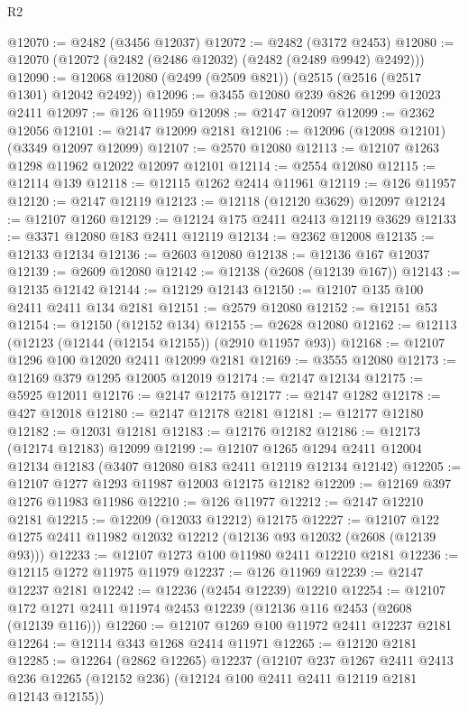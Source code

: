 \begin{lexlean}{R2}
\begin{coremodule}
@12070 := @2482 (@3456 @12037)
@12072 := @2482 (@3172 @2453)
@12080 := @12070 (@12072 (@2482 (@2486 @12032) (@2482 (@2489 @9942) @2492)))
@12090 := @12068 @12080 (@2499 (@2509 @821)) (@2515 (@2516 (@2517 @1301) @12042 @2492))
@12096 := @3455 @12080 @239 @826 @1299 @12023 @2411
@12097 := @126 @11959
@12098 := @2147 @12097
@12099 := @2362 @12056
@12101 := @2147 @12099 @2181
@12106 := @12096 (@12098 @12101) (@3349 @12097 @12099)
@12107 := @2570 @12080
@12113 := @12107 @1263 @1298 @11962 @12022 @12097 @12101
@12114 := @2554 @12080
@12115 := @12114 @139
@12118 := @12115 @1262 @2414 @11961
@12119 := @126 @11957
@12120 := @2147 @12119
@12123 := @12118 (@12120 @3629) @12097
@12124 := @12107 @1260
@12129 := @12124 @175 @2411 @2413 @12119 @3629
@12133 := @3371 @12080 @183 @2411 @12119
@12134 := @2362 @12008
@12135 := @12133 @12134
@12136 := @2603 @12080
@12138 := @12136 @167 @12037
@12139 := @2609 @12080
@12142 := @12138 (@2608 (@12139 @167))
@12143 := @12135 @12142
@12144 := @12129 @12143
@12150 := @12107 @135 @100 @2411 @2411 @134 @2181
@12151 := @2579 @12080
@12152 := @12151 @53
@12154 := @12150 (@12152 @134)
@12155 := @2628 @12080
@12162 := @12113 (@12123 (@12144 (@12154 @12155)) (@2910 @11957 @93))
@12168 := @12107 @1296 @100 @12020 @2411 @12099 @2181
@12169 := @3555 @12080
@12173 := @12169 @379 @1295 @12005 @12019
@12174 := @2147 @12134
@12175 := @5925 @12011
@12176 := @2147 @12175
@12177 := @2147 @1282
@12178 := @427 @12018
@12180 := @2147 @12178 @2181
@12181 := @12177 @12180
@12182 := @12031 @12181
@12183 := @12176 @12182
@12186 := @12173 (@12174 @12183) @12099
@12199 := @12107
    @1265
    @1294
    @2411
    @12004
    @12134
    @12183
    (@3407 @12080 @183 @2411 @12119 @12134 @12142)
@12205 := @12107 @1277 @1293 @11987 @12003 @12175 @12182
@12209 := @12169 @397 @1276 @11983 @11986
@12210 := @126 @11977
@12212 := @2147 @12210 @2181
@12215 := @12209 (@12033 @12212) @12175
@12227 := @12107 @122 @1275 @2411 @11982 @12032 @12212 (@12136 @93 @12032 (@2608 (@12139 @93)))
@12233 := @12107 @1273 @100 @11980 @2411 @12210 @2181
@12236 := @12115 @1272 @11975 @11979
@12237 := @126 @11969
@12239 := @2147 @12237 @2181
@12242 := @12236 (@2454 @12239) @12210
@12254 := @12107 @172 @1271 @2411 @11974 @2453 @12239 (@12136 @116 @2453 (@2608 (@12139 @116)))
@12260 := @12107 @1269 @100 @11972 @2411 @12237 @2181
@12264 := @12114 @343 @1268 @2414 @11971
@12265 := @12120 @2181
@12285 := @12264
    (@2862 @12265)
    @12237
    (@12107
      @237
      @1267
      @2411
      @2413
      @236
      @12265
      (@12152 @236)
      (@12124 @100 @2411 @2411 @12119 @2181 @12143 @12155))

\end{coremodule}
\end{lexlean}
